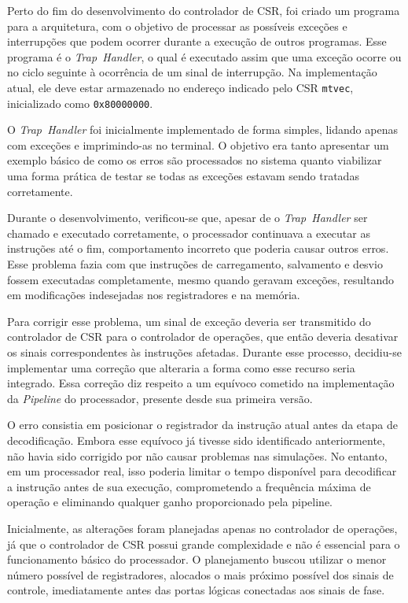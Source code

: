 \documentclass[
	12pt,				%
	openright,			%
	oneside,			%
	a4paper,			%
	english,			%
	french,				%
	spanish,			%
	brazil,				%
	]{abntex2}
\begin{document}
Perto do fim do desenvolvimento do controlador de CSR, foi criado um programa para a arquitetura, com o objetivo de processar as possíveis exceções e interrupções que podem ocorrer durante a execução de outros programas. Esse programa é o \textit{Trap~Handler}, o qual é executado assim que uma exceção ocorre ou no ciclo seguinte à ocorrência de um sinal de interrupção. Na implementação atual, ele deve estar armazenado no endereço indicado pelo CSR \texttt{mtvec}, inicializado como \texttt{0x80000000}.

O \textit{Trap~Handler} foi inicialmente implementado de forma simples, lidando apenas com exceções e imprimindo-as no terminal. O objetivo era tanto apresentar um exemplo básico de como os erros são processados no sistema quanto viabilizar uma forma prática de testar se todas as exceções estavam sendo tratadas corretamente.

Durante o desenvolvimento, verificou-se que, apesar de o \textit{Trap~Handler} ser chamado e executado corretamente, o processador continuava a executar as instruções até o fim, comportamento incorreto que poderia causar outros erros. Esse problema fazia com que instruções de carregamento, salvamento e desvio fossem executadas completamente, mesmo quando geravam exceções, resultando em modificações indesejadas nos registradores e na memória.

Para corrigir esse problema, um sinal de exceção deveria ser transmitido do controlador de CSR para o controlador de operações, que então deveria desativar os sinais correspondentes às instruções afetadas. Durante esse processo, decidiu-se implementar uma correção que alteraria a forma como esse recurso seria integrado. Essa correção diz respeito a um equívoco cometido na implementação da \textit{Pipeline} do processador, presente desde sua primeira versão.

O erro consistia em posicionar o registrador da instrução atual antes da etapa de decodificação. Embora esse equívoco já tivesse sido identificado anteriormente, não havia sido corrigido por não causar problemas nas simulações. No entanto, em um processador real, isso poderia limitar o tempo disponível para decodificar a instrução antes de sua execução, comprometendo a frequência máxima de operação e eliminando qualquer ganho proporcionado pela pipeline.

Inicialmente, as alterações foram planejadas apenas no controlador de operações, já que o controlador de CSR possui grande complexidade e não é essencial para o funcionamento básico do processador. O planejamento buscou utilizar o menor número possível de registradores, alocados o mais próximo possível dos sinais de controle, imediatamente antes das portas lógicas conectadas aos sinais de fase.
\end{document}
